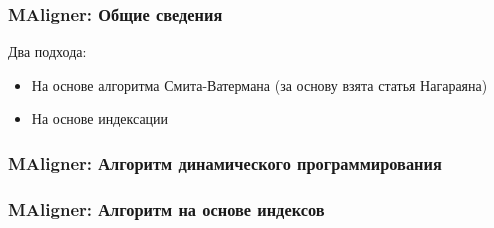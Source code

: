 \begin{frame}
\frametitle{MAligner: Общие сведения}
Два подхода:
\begin{itemize}
  \item На основе алгоритма Смита-Ватермана (за основу взята статья Нагараяна)
  \item На основе индексации
\end{itemize}
\end{frame}

\begin{frame}
\frametitle{MAligner: Алгоритм динамического программирования}

\end{frame}

\begin{frame}
\frametitle{MAligner: Алгоритм на основе индексов}

\end{frame}
